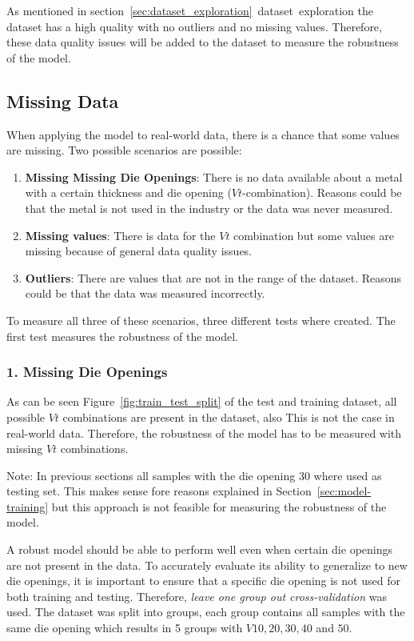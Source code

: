 As mentioned in section~\ref{sec:dataset_exploration}~dataset~exploration the dataset has a high quality with no outliers and no missing values.
Therefore, these data quality issues will be added to the dataset to measure the robustness of the model.

\subsection{Missing Data}
When applying the model to real-world data, there is a chance that some values are missing. Two possible scenarios are possible:

\begin{enumerate}
    \item \textbf{Missing Missing Die Openings}: There is no data available about a metal with a certain thickness and die opening ($Vt$-combination). Reasons could be that the metal is not used in the industry or the data was never measured.
    \item \textbf{Missing values}: There is data for the $Vt$ combination but some values are missing because of general data quality issues.
    \item \textbf{Outliers}: There are values that are not in the range of the dataset. Reasons could be that the data was measured incorrectly.
\end{enumerate}

To measure all three of these scenarios, three different tests where created. The first test measures the robustness of the model.

\subsubsection*{1. Missing Die Openings}
As can be seen Figure~\ref{fig:train_test_split} of the test and training dataset, all possible $Vt$ combinations are present in the dataset, also
This is not the case in real-world data. Therefore, the robustness of the model has to be measured with missing $Vt$ combinations.

Note: In previous sections all samples with the die opening 30 where used as testing set. This makes sense fore reasons explained in Section~\ref{sec:model-training} but this approach is not feasible for measuring the robustness of the model.

A robust model should be able to perform well even when certain die openings are not present in the data. To accurately evaluate its ability to generalize to new die openings, it is important to ensure that a specific die opening is not used for both training and testing.
Therefore, \textit{leave one group out cross-validation} was used.
The dataset was split into groups, each group contains all samples with the same die opening which results in 5 groups with $V 10, 20, 30, 40$ and $50$.

